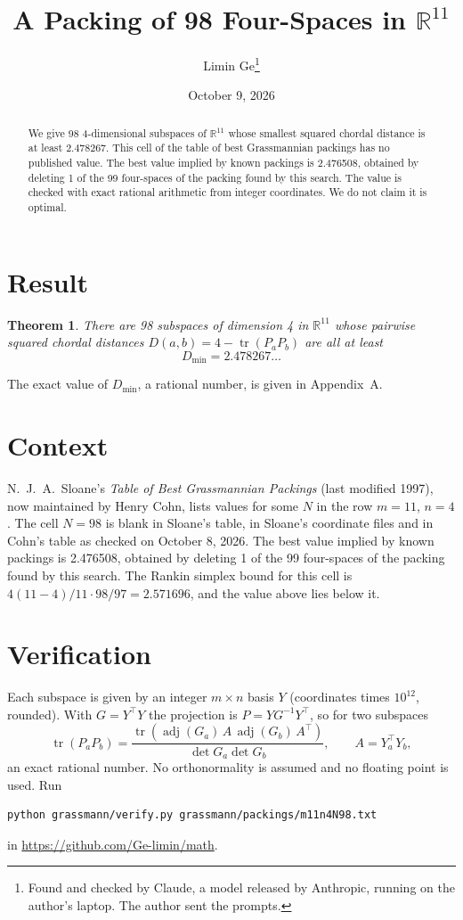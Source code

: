 \documentclass[11pt,a4paper]{article}
\title{A Packing of 98 Four-Spaces in $\mathbb{R}^{11}$}
\author{Limin Ge\thanks{Found and checked by Claude, a model released by Anthropic, running on the author's laptop. The author sent the prompts.}}
\date{October 9, 2026}
\newtheorem*{theorem}{Theorem}
\begin{document}
\maketitle
\begin{abstract}
We give 98 4-dimensional subspaces of $\mathbb{R}^{11}$ whose smallest squared chordal distance is at least 2.478267. This cell of the table of best Grassmannian packings has no published value. The best value implied by known packings is 2.476508, obtained by deleting 1 of the 99 four-spaces of the packing found by this search. The value is checked with exact rational arithmetic from integer coordinates. We do not claim it is optimal.
\end{abstract}

\section{Result}
\begin{theorem}
There are 98 subspaces of dimension 4 in $\mathbb{R}^{11}$ whose pairwise squared chordal distances $D(a,b) = 4 - \operatorname{tr}(P_aP_b)$ are all at least
\[ D_{\min} = 2.478267\ldots \]
\end{theorem}
The exact value of $D_{\min}$, a rational number, is given in Appendix~A.


\section{Context}
N.~J.~A.~Sloane's \emph{Table of Best Grassmannian Packings} (last modified 1997), now maintained by Henry Cohn, lists values for some $N$ in the row $m=11$, $n=4$. The cell $N=98$ is blank in Sloane's table, in Sloane's coordinate files and in Cohn's table as checked on October 8, 2026. The best value implied by known packings is 2.476508, obtained by deleting 1 of the 99 four-spaces of the packing found by this search. The Rankin simplex bound for this cell is $4(11-4)/11\cdot 98/97 = 2.571696$, and the value above lies below it.


\section{Verification}
Each subspace is given by an integer $m\times n$ basis $Y$ (coordinates times $10^{12}$, rounded). With $G=Y^\top Y$ the projection is $P=YG^{-1}Y^\top$, so for two subspaces
\[ \operatorname{tr}(P_aP_b)=\frac{\operatorname{tr}(\operatorname{adj}(G_a)\,A\,\operatorname{adj}(G_b)\,A^\top)}{\det G_a\det G_b},\qquad A=Y_a^\top Y_b, \]
an exact rational number. No orthonormality is assumed and no floating point is used. Run
\begin{verbatim}
python grassmann/verify.py grassmann/packings/m11n4N98.txt
\end{verbatim}
in \url{https://github.com/Ge-limin/math}.
\end{document}
